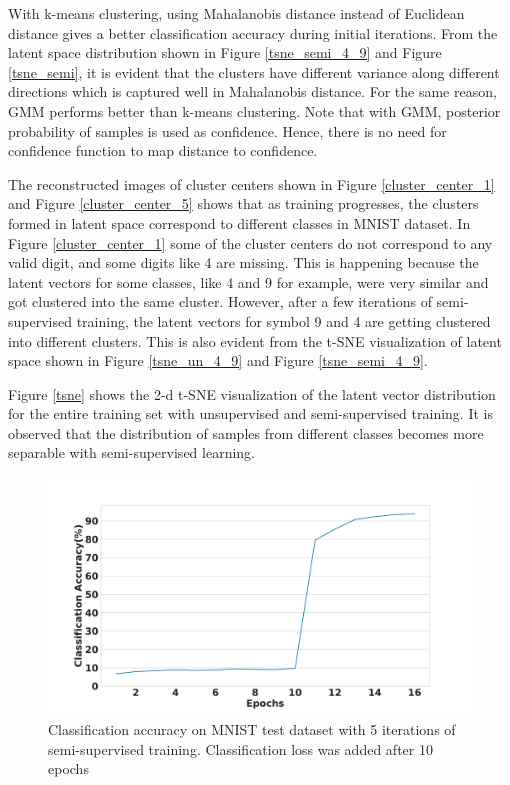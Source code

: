 \documentclass{bmvc2k}
\begin{document}
With k-means clustering, using Mahalanobis distance instead of Euclidean distance gives a better classification accuracy during initial iterations.
From the latent space distribution shown in Figure \ref{tsne_semi_4_9} and Figure \ref{tsne_semi}, it is evident that the clusters have different variance along different directions which is captured well in Mahalanobis distance.
For the same reason, GMM performs better than k-means clustering.
Note that with GMM, posterior probability of samples is used as confidence.
Hence, there is no need for confidence function to map distance to confidence.

The reconstructed images of cluster centers shown in Figure \ref{cluster_center_1} and Figure \ref{cluster_center_5} shows that as training progresses, the clusters formed in latent space correspond to different classes in MNIST dataset.
In Figure \ref{cluster_center_1} some of the cluster centers do not correspond to any valid digit, and some digits like 4  are missing.
This is happening because the latent vectors for some classes, like  4 and 9 for example,  were very similar and got clustered into the same cluster.
However, after a few iterations of semi-supervised training, the latent vectors for symbol 9 and 4 are getting clustered into different clusters.
This is also evident from the t-SNE visualization of latent space shown in Figure \ref{tsne_un_4_9} and Figure \ref{tsne_semi_4_9}.

Figure \ref{tsne} shows the 2-d t-SNE visualization of the latent vector distribution for the entire training set with unsupervised and semi-supervised training.
It is observed that the distribution of samples from different classes becomes more separable with semi-supervised learning.

\begin{figure}[!t]
\centering
  \centering
  \includegraphics[width=.5\linewidth]{images/classification_acc_semi_supervised}
\vspace{0.1in}

\caption{Classification accuracy on MNIST test dataset with 5 iterations of semi-supervised training. Classification loss was added after 10 epochs}
\label{classificaion_acc}
\end{figure}
\end{document}
